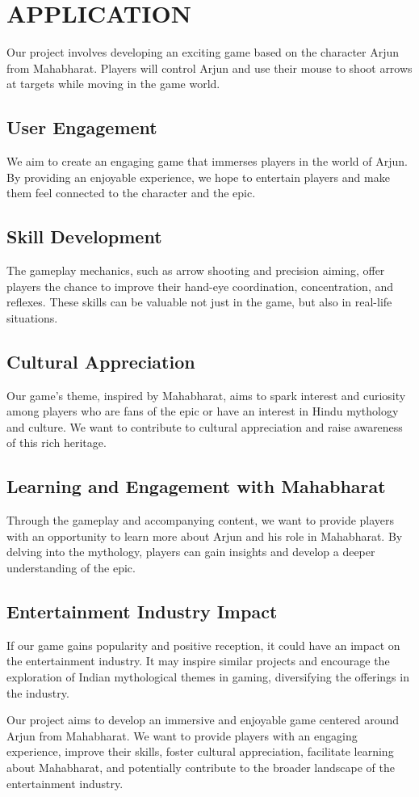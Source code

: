 
\section{APPLICATION}
Our project involves developing an exciting game based on the character Arjun from Mahabharat. Players will control Arjun and use their mouse to shoot arrows at targets while moving in the game world.



 \subsection{User Engagement}
	We aim to create an engaging game that immerses players in the world of Arjun. By providing an enjoyable experience, we hope to entertain players and make them feel connected to the character and the epic.
	
 \subsection{Skill Development}
	The gameplay mechanics, such as arrow shooting and precision aiming, offer players the chance to improve their hand-eye coordination, concentration, and reflexes. These skills can be valuable not just in the game, but also in real-life situations.
	
 \subsection{Cultural Appreciation}
	Our game's theme, inspired by Mahabharat, aims to spark interest and curiosity among players who are fans of the epic or have an interest in Hindu mythology and culture. We want to contribute to cultural appreciation and raise awareness of this rich heritage.
	
 \subsection{Learning and Engagement with Mahabharat}
	Through the gameplay and accompanying content, we want to provide players with an opportunity to learn more about Arjun and his role in Mahabharat. By delving into the mythology, players can gain insights and develop a deeper understanding of the epic.

\subsection{ Entertainment Industry Impact}
	If our game gains popularity and positive reception, it could have an impact on the entertainment industry. It may inspire similar projects and encourage the exploration of Indian mythological themes in gaming, diversifying the offerings in the industry.



Our project aims to develop an immersive and enjoyable game centered around Arjun from Mahabharat. We want to provide players with an engaging experience, improve their skills, foster cultural appreciation, facilitate learning about Mahabharat, and potentially contribute to the broader landscape of the entertainment industry.

\pagebreak


\newpage